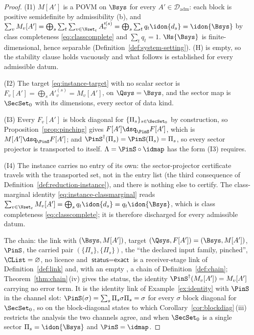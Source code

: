 \begin{proof}
(I1) $M[A']$ is a POVM on $\Bsys$ for every $A'\in\mathcal{D}_{\mathrm{adm}}$:
each block is positive semidefinite by admissibility (b), and
$\sum_vM_v[A']=\bigoplus_s\sum_t\sum_{v\in\Vset_t}A'^{(s)}_v
=\bigoplus_s\sum_tq_t\idon{d_s}=\idon{\Bsys}$ by class completeness
\eqref{eq:classcomplete} and $\sum_tq_t=1$. $\Hs{\Bsys}$ is
finite-dimensional, hence separable (Definition~\ref{def:system-setting}).
(H) is
empty, so the stability clause holds vacuously and what follows is
established for every admissible datum.

(I2) The target \eqref{eq:instance-target} with no scalar sector is
$F_v[A']=\bigoplus_sA'^{(s)}_v=M_v[A']$, on $\Qsys=\Bsys$, and the sector map
is $\SecSet_0$ with its dimensions, every sector of data kind.

(I3) Every $F_v[A']$ is block diagonal for $\{\Pi_s\}_{s\in\SecSet_0}$ by
construction, so Proposition~\ref{prop:pinching} gives
$F[A']\dsq_{\PinS}F[A']$, which is $M[A']\dsq_{\PinS}F[A']$; and
$\PinS^{\dagger}(\Pi_s)=\PinS(\Pi_s)=\Pi_s$, so every sector projector is
transported to itself. $\Lambda=\PinS\circ\idmap$ has the form (I3) requires.

(I4) The instance carries no entry of its own: the sector-projector
certificate travels with the transported set, not in the entry list (the
third consequence of Definition~\ref{def:reduction-instance}), and there is
nothing else to certify. The class-marginal identity
\eqref{eq:instance-classmarginal} reads
$\sum_{v\in\Vset_t}M_v[A']=\bigoplus_sq_t\idon{d_s}=q_t\idon{\Bsys}$, which
is class completeness \eqref{eq:classcomplete}; it is therefore discharged
for every admissible datum.

The chain: the link with  $(\Bsys,M[A'])$, target
$(\Qsys,F[A'])=(\Bsys,M[A'])$,  $\PinS$, the carried
pair $(\{\Pi_s\},\{\Pi_s\})$, the  ``the
declared input family, pinched'', $\CList=\varnothing$, no licence and
$\textsf{status}=\textsf{exact}$ is a receiver-stage link of
Definition~\ref{def:link} and, with an empty , a chain of
Definition~\ref{def:chain}; Theorem~\ref{thm:chain}\,(iv) gives the status,
the identity $\PinS^{\dagger}(M_v[A'])=M_v[A']$ carrying no error term. It is
the identity link of Example~\ref{ex:identity} with $\PinS$ in the channel
slot: $\PinS(\sigma)=\sum_s\Pi_s\sigma\Pi_s=\sigma$ for every $\sigma$ block
diagonal for $\SecSet_0$, so on the block-diagonal states to which
Corollary~\ref{cor:blockdiag}\,(iii) restricts the analysis the two channels
agree, and when $\SecSet_0$ is a single sector $\Pi_s=\idon{\Bsys}$ and
$\PinS=\idmap$.
\end{proof}
